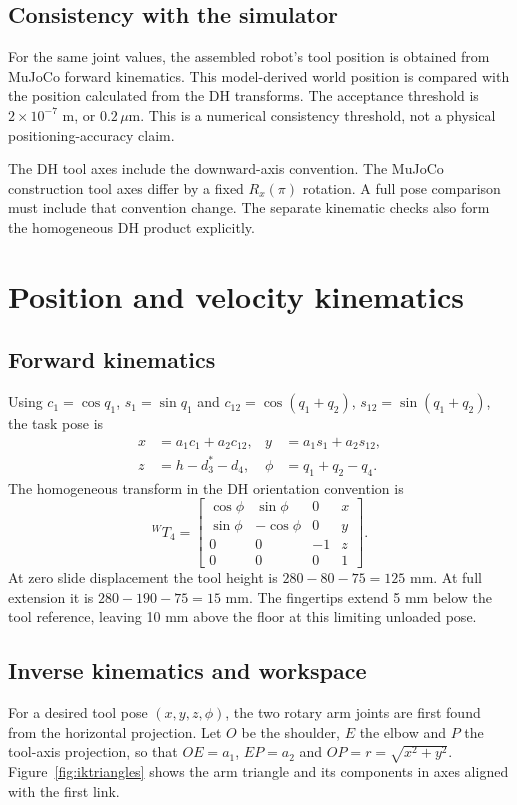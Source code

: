 \documentclass[11pt,a4paper]{article}
\begin{document}
\subsection{Consistency with the simulator}
For the same joint values, the assembled robot's tool position is
obtained from MuJoCo forward kinematics. This model-derived world
position is compared with the position calculated from the DH transforms. The
acceptance threshold is $2\times10^{-7}$ m, or $0.2\,\mu$m. This is a
numerical consistency threshold, not a physical positioning-accuracy claim.

The DH tool axes include the downward-axis convention. The MuJoCo
construction tool axes differ by a fixed $R_x(\pi)$ rotation. A full pose
comparison must include that convention change. The separate kinematic
checks also form the homogeneous DH product explicitly.
\FloatBarrier

\section{Position and velocity kinematics}\label{sec:kinematics}
\subsection{Forward kinematics}
Using $c_1=\cos q_1$, $s_1=\sin q_1$ and
$c_{12}=\cos(q_1+q_2)$, $s_{12}=\sin(q_1+q_2)$, the task pose is
\begin{align}
 x&=a_1c_1+a_2c_{12},& y&=a_1s_1+a_2s_{12},\\
 z&=h-d_3^*-d_4,& \phi&=q_1+q_2-q_4.
\end{align}
The homogeneous transform in the DH orientation convention is
\begin{equation}
 {}^WT_4=\begin{bmatrix}
 \cos\phi&\sin\phi&0&x\\
 \sin\phi&-\cos\phi&0&y\\
 0&0&-1&z\\0&0&0&1
 \end{bmatrix}.
\end{equation}
At zero slide displacement the tool height is $280-80-75=125$ mm. At full
extension it is $280-190-75=15$ mm. The fingertips extend 5 mm below the tool
reference, leaving 10 mm above the floor at this limiting unloaded pose.

\subsection{Inverse kinematics and workspace}
For a desired tool pose $(x,y,z,\phi)$, the two rotary arm joints are first
found from the horizontal projection. Let $O$ be the shoulder, $E$ the elbow
and $P$ the tool-axis projection, so that $OE=a_1$, $EP=a_2$ and
$OP=r=\sqrt{x^2+y^2}$. Figure~\ref{fig:iktriangles} shows the arm triangle
and its components in axes aligned with the first link.
\end{document}
